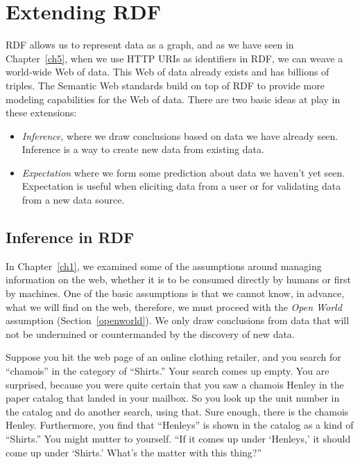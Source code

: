 \chapter{Extending RDF}
\label{ch7}

RDF allows us to represent data as a graph, and as we have seen in Chapter~\ref{ch5}, when we use HTTP URIs as 
identifiers in RDF, we can weave a world-wide Web of data.  This Web of data already exists and has billions of triples. The Semantic Web standards build on top of RDF to provide more modeling capabilities for the Web of data.  There are two basic ideas at play in these extensions:

\begin{itemize}
    \item \emph{Inference}, where we draw conclusions based on data we have already seen.  Inference is
    a way to create new data from existing data. 
    \item \emph{Expectation} where we form some prediction about data we haven't yet seen.  Expectation is useful when 
    eliciting data from a user or for validating data from a new data source. 
\end{itemize}

\section{Inference in RDF}

In Chapter~\ref{ch1}, we examined some of the assumptions around managing information on the web, 
whether it is to be consumed directly by humans or first by machines.  One of the basic assumptions is
that we cannot know, in advance, what we will find on the web, therefore, we must proceed with the \emph{Open World} assumption (Section~\ref{openworld}).  We only draw conclusions from data that will not be undermined or countermanded by the discovery of new data.  



Suppose you hit the web page of an online clothing retailer, and you
search for ``chamois'' in the category of ``Shirts.'' Your search comes
up empty. You are surprised, because you were quite certain that you saw
a chamois Henley in the paper catalog that landed in your mailbox. So
you look up the unit number in the catalog and do another search, using
that. Sure enough, there is the chamois Henley. Furthermore, you find
that ``Henleys'' is shown in the catalog as a kind of ``Shirts.'' You might
mutter to yourself. ``If it comes up under `Henleys,' it should come up
under `Shirts.' What's the matter with this thing?''

